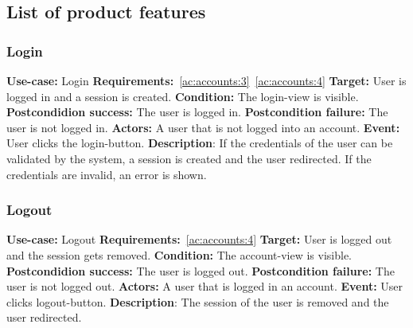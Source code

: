 \subsection{List of product features}\label{subsec:list-of-product-features}

\subsubsection{Login}\label{subsubsec:login}
\textbf{Use-case:} Login \newline
\textbf{Requirements:}~\ref{ac:accounts:3}~\ref{ac:accounts:4} \newline
\textbf{Target:} User is logged in and a session is created. \newline
\textbf{Condition:} The login-view is visible. \newline
\textbf{Postcondidion success:} The user is logged in. \newline
\textbf{Postcondition failure:} The user is not logged in. \newline
\textbf{Actors:} A user that is not logged into an account. \newline
\textbf{Event:} User clicks the login-button. \newline
\textbf{Description}: If the credentials of the user can be validated by the system, a session is created and the user redirected.
If the credentials are invalid, an error is shown.

\subsubsection{Logout}\label{subsubsec:logout}
\textbf{Use-case:} Logout \newline
\textbf{Requirements:}~\ref{ac:accounts:4} \newline
\textbf{Target:} User is logged out and the session gets removed. \newline
\textbf{Condition:} The account-view is visible. \newline
\textbf{Postcondidion success:} The user is logged out. \newline
\textbf{Postcondition failure:} The user is not logged out. \newline
\textbf{Actors:} A user that is logged in an account. \newline
\textbf{Event:} User clicks logout-button. \newline
\textbf{Description}: The session of the user is removed and the user redirected.


